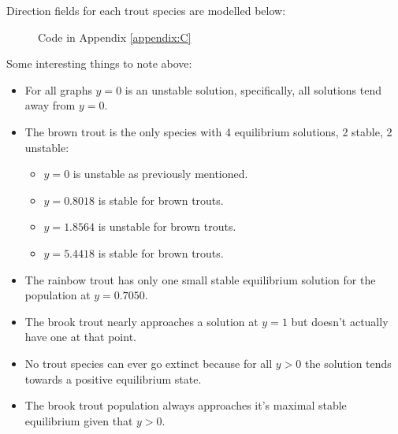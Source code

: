 \documentclass[letterpaper,12pt]{article}
\begin{document}
Direction fields for each trout species are modelled below:
\begin{figure}[H]
    \begin{adjustwidth}{-1in}{-1in}
    \centering
    \begin{subfigure}[b]{0.65\textwidth}
        \centering
        
        \label{fig:4a}
    \end{subfigure}
    \hfill
    \begin{subfigure}[b]{0.65\textwidth}
        \centering
        
        \label{fig:4b}
    \end{subfigure}
    \hfill
    \begin{subfigure}[b]{0.65\textwidth}
        \centering
        
        \label{fig:4c}
    \end{subfigure}
    \caption{Code in Appendix \ref{appendix:C}}
    \label{fig:4}
    \end{adjustwidth}
\end{figure}
Some interesting things to note above:
\begin{itemize}
    \item For all graphs \(y = 0\) is an unstable solution, specifically, all solutions tend away from \(y = 0\).
    \item The brown trout is the only species with 4 equilibrium solutions, 2 stable, 2 unstable:
        \begin{itemize}
            \item \(y = 0\) is unstable as previously mentioned.
            \item \(y = 0.8018\) is stable for brown trouts.
            \item \(y = 1.8564\) is unstable for brown trouts.
            \item \(y = 5.4418\) is stable for brown trouts.
        \end{itemize}
    \item The rainbow trout has only one small stable equilibrium solution for the population at \(y = 0.7050\).
    \item The brook trout nearly approaches a solution at \(y = 1\) but doesn't actually have one at that point.
    \item No trout species can ever go extinct because for all \(y > 0\) the solution tends towards a positive equilibrium state.
    \item The brook trout population always approaches it's maximal stable equilibrium given that \(y > 0\).
\end{itemize}
\end{document}
